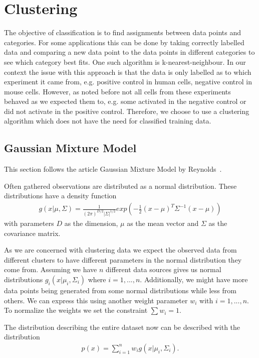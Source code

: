 \chapter{Clustering}

The objective of classification is to find assignments between data points and categories. For some applications this can be done by taking correctly labelled data and comparing a new data point to the data points in different categories to see which category best fits. One such algorithm is k-nearest-neighbour. In our context the issue with this approach is that the data is only labelled as to which experiment it came from, e.g. positive control in human cells, negative control in mouse cells. However, as noted before not all cells from these experiments behaved as we expected them to, e.g. some activated in the negative control or did not activate in the positive control. Therefore, we choose to use a clustering algorithm which does not have the need for classified training data.

\section{Gaussian Mixture Model}

This section follows the article Gaussian Mixture Model by Reynolds~\cite{reynolds2009}.

Often gathered observations are distributed as a normal distribution. These distributions have a density function
\begin{align*}
	g(x|\mu, \Sigma) = \frac{1}{(2\pi)^{D/2} |\Sigma|^{1/2}} exp\left( - \frac{1}{2} (x-\mu)^T \Sigma^{-1} (x-\mu) \right)
\end{align*}
with parameters $D$ as the dimension, $\mu$ as the mean vector and $\Sigma$ as the covariance matrix.

As we are concerned with clustering data we expect the observed data from different clusters to have different parameters in the normal distribution they come from. Assuming we have $n$ different data sources gives us normal distributions $g_i(x|\mu_i, \Sigma_i)$ where $i=1, ..., n$. Additionally, we might have more data points being generated from some normal distributions while less from others. We can express this using another weight parameter $w_i$ with $i=1, ..., n$. To normalize the weights we set the constraint $\sum w_i = 1$.

The distribution describing the entire dataset now can be described with the distribution
\begin{align}
	\label{eq:sum_of_normal}
	p(x) = \sum_{i=1}^{n} w_i g(x|\mu_i, \Sigma_i).
\end{align}

